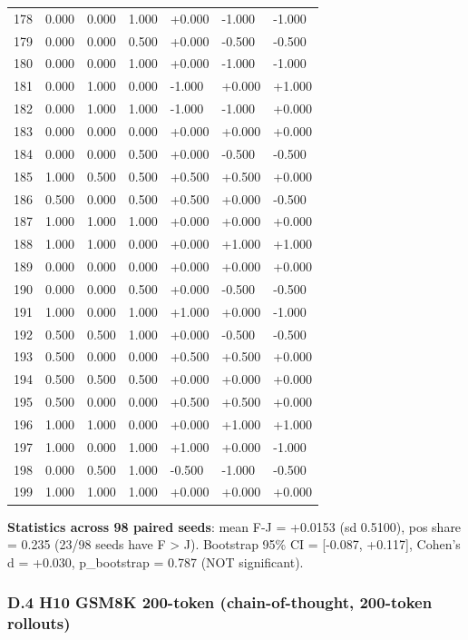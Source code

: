 \documentclass[
]{article}
\begin{document}
{\begin{longtable}[]{@{}lllllll@{}}
178 & 0.000 & 0.000 & 1.000 & +0.000 & -1.000 & -1.000 \\
179 & 0.000 & 0.000 & 0.500 & +0.000 & -0.500 & -0.500 \\
180 & 0.000 & 0.000 & 1.000 & +0.000 & -1.000 & -1.000 \\
181 & 0.000 & 1.000 & 0.000 & -1.000 & +0.000 & +1.000 \\
182 & 0.000 & 1.000 & 1.000 & -1.000 & -1.000 & +0.000 \\
183 & 0.000 & 0.000 & 0.000 & +0.000 & +0.000 & +0.000 \\
184 & 0.000 & 0.000 & 0.500 & +0.000 & -0.500 & -0.500 \\
185 & 1.000 & 0.500 & 0.500 & +0.500 & +0.500 & +0.000 \\
186 & 0.500 & 0.000 & 0.500 & +0.500 & +0.000 & -0.500 \\
187 & 1.000 & 1.000 & 1.000 & +0.000 & +0.000 & +0.000 \\
188 & 1.000 & 1.000 & 0.000 & +0.000 & +1.000 & +1.000 \\
189 & 0.000 & 0.000 & 0.000 & +0.000 & +0.000 & +0.000 \\
190 & 0.000 & 0.000 & 0.500 & +0.000 & -0.500 & -0.500 \\
191 & 1.000 & 0.000 & 1.000 & +1.000 & +0.000 & -1.000 \\
192 & 0.500 & 0.500 & 1.000 & +0.000 & -0.500 & -0.500 \\
193 & 0.500 & 0.000 & 0.000 & +0.500 & +0.500 & +0.000 \\
194 & 0.500 & 0.500 & 0.500 & +0.000 & +0.000 & +0.000 \\
195 & 0.500 & 0.000 & 0.000 & +0.500 & +0.500 & +0.000 \\
196 & 1.000 & 1.000 & 0.000 & +0.000 & +1.000 & +1.000 \\
197 & 1.000 & 0.000 & 1.000 & +1.000 & +0.000 & -1.000 \\
198 & 0.000 & 0.500 & 1.000 & -0.500 & -1.000 & -0.500 \\
199 & 1.000 & 1.000 & 1.000 & +0.000 & +0.000 & +0.000 \\
\end{longtable}
}

\textbf{Statistics across 98 paired seeds}: mean F-J = +0.0153 (sd
0.5100), pos share = 0.235 (23/98 seeds have F \textgreater{} J).
Bootstrap 95\% CI = {[}-0.087, +0.117{]}, Cohen's d = +0.030,
p\_bootstrap = 0.787 (NOT significant).

\subsubsection{D.4 H10 GSM8K 200-token (chain-of-thought, 200-token
rollouts)}\label{d.4-h10-gsm8k-200-token-chain-of-thought-200-token-rollouts}
\end{document}
